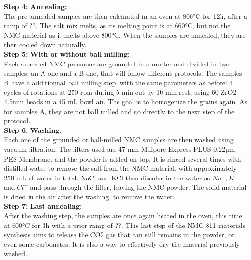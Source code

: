 \documentclass{article}
\begin{document}
\textbf{Step 4: Annealing:}\\
The pre-annealed samples are then calcinated in an oven at 800°C for 12h, after a ramp of ??. The salt mix melts, as its melting point is at 660°C, but not the NMC material as it melts above 800°C. When the samples are annealed, they are then cooled down naturally.\\

\textbf{Step 5: With or without ball milling:}\\
Each annealed NMC precursor are grounded in a morter and divided in two samples: an  A one and a B one, that will follow different protocols. The samples B have a additionnal ball milling step, with the same parameters as before: 4 cycles of rotations at 250 rpm during 5 min cut by 10 min rest, using 60 ZrO2 4.5mm beads in a 45 mL bowl air. The goal is to homogenize the grains again. As for samples A, they are not ball milled and go directly to the next step of the protocol.\\

\textbf{Step 6: Washing:}\\
Each one of the grounded or ball-milled NMC samples are then washed using vacuum filtration. The filters used are 47 mm Milipore Express PLUS 0.22µm PES Membrane, and the powder is added on top. It is rinced several times with distilled water to remove the salt from the NMC material, with approximately 250 mL of water in total. NaCl and KCl then dissolve in the water as  $Na^+, K^+$ and $ Cl^-$ and pass through the filter, leaving the NMC powder. The solid material is dried in the air after the washing, to remove the water. \\

\textbf{Step 7: Last annealing:}\\
After the washing step, the samples are once again heated in the oven, this time at 600°C for 3h with a prior ramp of ??. This last step of the NMC 811 materials synthesis aims to release the CO2 gas that can still remains in the powder, or even some carbonates. It is also a way to effectively dry the material previously washed.\\
\end{document}
